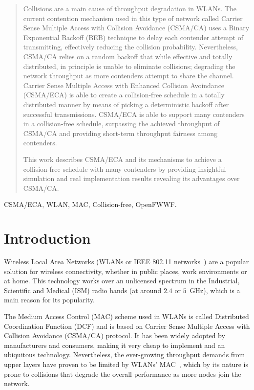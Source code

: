 \documentclass[a4paper,journal]{IEEEtran}
\begin{document}
\begin{abstract}

\boldmath Collisions are a main cause of throughput degradation in WLANs. The current contention mechanism used in this type of network called Carrier Sense Multiple Access with Collision Avoidance (CSMA/CA) uses a Binary Exponential Backoff (BEB) technique to delay each contender attempt of transmitting, effectively reducing the collision probability. Nevertheless, CSMA/CA relies on a random backoff that while effective and totally distributed, in principle is unable to eliminate collisions; degrading the network throughput as more contenders attempt to share the channel. Carrier Sense Multiple Access with Enhanced Collision Avoindance (CSMA/ECA) is able to create a collision-free schedule in a totally distributed manner by means of picking a deterministic backoff after successful transmissions. CSMA/ECA is able to support many contenders in a collision-free schedule, surpassing the achieved throughput of CSMA/CA and providing short-term throughput fairness among contenders.

This work describes CSMA/ECA and its mechanisms to achieve a collision-free schedule with many contenders by providing insightful simulation and real implementation results revealing its advantages over CSMA/CA. 

\end{abstract}

\begin{IEEEkeywords}
CSMA/ECA, WLAN, MAC, Collision-free, OpenFWWF.
\end{IEEEkeywords}

\section{Introduction}\label{introduction}
Wireless Local Area Networks (WLANs or IEEE 802.11 networks~\cite{802Standards}) are a popular solution for wireless connectivity, whether in public places, work environments or at home. This technology works over an unlicensed spectrum in the Industrial, Scientific and Medical (ISM) radio bands (at around $2.4$ or $5$~GHz), which is a main reason for its popularity. 

The Medium Access Control (MAC) scheme used in WLANs is called Distributed Coordination Function (DCF) and is based on Carrier Sense Multiple Access with Collision Avoidance (CSMA/CA) protocol. It has been widely adopted by manufacturers and consumers, making it very cheap to implement and an ubiquitous technology. Nevertheless, the ever-growing throughput demands from upper layers have proven to be limited by WLANs' MAC~\cite{perahia2008ieee}, which by its nature is prone to collisions that degrade the overall performance as more nodes join the network.
\end{document}
